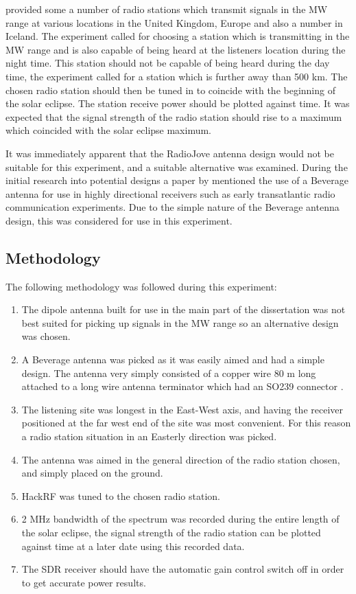 \documentclass[runningheads,a4paper]{llncs}
\begin{document}
\cite{RSGB-15-b} provided some a number of radio stations which transmit signals in the \gls{MW} range at various locations in the United Kingdom, Europe and also a number in Iceland. The experiment called for choosing a station which is transmitting in the \gls{MW} range and is also capable of being heard at the listeners location during the night time. This station should not be capable of being heard during the day time, the experiment called for a station which is further away than 500 km. The chosen radio station should then be tuned in to coincide with the beginning of the solar eclipse. The station receive power should be plotted against time. It was expected that the signal strength of the radio station should rise to a maximum which coincided with the solar eclipse maximum.

It was immediately apparent that the RadioJove antenna design would not be suitable for this experiment, and a suitable alternative was examined. During the initial research into potential designs a paper by \cite{litva-76} mentioned the use of a Beverage antenna for use in highly directional receivers such as early transatlantic radio communication experiments. Due to the simple nature of the Beverage antenna design, this was considered for use in this experiment.


\subsection*{Methodology}
The following methodology was followed during this experiment:

\begin{enumerate}
	\item The dipole antenna built for use in the main part of the dissertation was not best suited for picking up signals in the \gls{MW} range so an alternative design was chosen. 
	\item A Beverage antenna was picked as it was easily aimed and had a simple design. The antenna very simply consisted of a copper wire 80 m long attached to a long wire antenna terminator which had an SO239 connector \citep{litva-76}.
	\item The listening site was longest in the East-West axis, and having the receiver positioned at the far west end of the site was most convenient. For this reason a radio station situation in an Easterly direction was picked.
	\item The antenna was aimed in the general direction of the radio station chosen, and simply placed on the ground.
	\item HackRF was tuned to the chosen radio station.
	\item 2 MHz bandwidth of the spectrum was recorded during the entire length of the solar eclipse, the signal strength of the radio station can be plotted against time at a later date using this recorded data.
	\item The \gls{SDR} receiver should have the automatic gain control switch off in order to get accurate power results. 
\end{enumerate}
\end{document}
